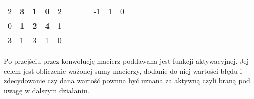 \begin{table}[h]
\begin{tabular}{lllllllllllllllllllllll}
\multicolumn{1}{|l|}{2} & \multicolumn{1}{l|}{\textbf{3}} & \multicolumn{1}{l|}{\textbf{1}} & \multicolumn{1}{l|}{\textbf{0}} & \multicolumn{1}{l|}{2} &  &  & \multicolumn{1}{l|}{} & \multicolumn{1}{l|}{-1} & \multicolumn{1}{l|}{1}  & \multicolumn{1}{l|}{0}  &  &  &                       &                         &                        &  &  &                       &                        &                         &  &  \\ \cline{1-5} \cline{9-11}
\multicolumn{1}{|l|}{0} & \multicolumn{1}{l|}{\textbf{1}} & \multicolumn{1}{l|}{\textbf{2}} & \multicolumn{1}{l|}{\textbf{4}} & \multicolumn{1}{l|}{1} &  &  &                       &                         &                         &                         &  &  &                       &                         &                        &  &  &                       &                        &                         &  &  \\ \cline{1-5}
\multicolumn{1}{|l|}{3} & \multicolumn{1}{l|}{1}          & \multicolumn{1}{l|}{3}          & \multicolumn{1}{l|}{1}          & \multicolumn{1}{l|}{0} &  &  &                       &                         &                         &                         &  &  &                       &                         &                        &  &  &                       &                        &                         &  &  \\ \cline{1-5}
\end{tabular}
\end{table}

Po przejściu przez konwolucję macierz poddawana jest funkcji aktywacyjnej. Jej celem jest obliczenie ważonej sumy macierzy, dodanie do niej wartości błędu i zdecydowanie czy dana wartość pownna być uznana za aktywną czyli braną pod uwagę w dalszym działaniu.

